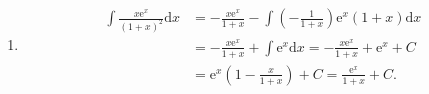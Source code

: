 \begin{solution}
\begin{enumerate}
        \item \begin{align*}
                  \int \frac{x \mathrm{e}^x}{(1 + x)^2} \mathrm{d}x & = -\frac{x \mathrm{e}^x}{1 + x} - \int \left(-\frac{1}{1 + x}\right) \mathrm{e}^x (1 + x) \mathrm{d}x               \\
                                                                    & = -\frac{x \mathrm{e}^x}{1 + x} + \int \mathrm{e}^x \mathrm{d}x  = -\frac{x \mathrm{e}^x}{1 + x} + \mathrm{e}^x + C \\
                                                                    & = \mathrm{e}^x \left( 1 - \frac{x}{1 + x} \right) + C  = \frac{\mathrm{e}^x}{1 + x} + C.
              \end{align*}
    \end{enumerate}
\end{solution}

\newpage